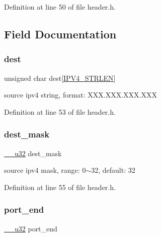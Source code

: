 Definition at line 50 of file header.\+h.



\subsection{Field Documentation}
\mbox{\label{struct_input_arguments_a2fbdfdcfd2976c224421d481d0935d8d}} 
\subsubsection{\texorpdfstring{dest}{dest}}
{\footnotesize\ttfamily unsigned char dest\mbox{[}\hyperlink{header_8h_ad5057f0ae40bc5ff36e7c9e65ea6c457}{I\+P\+V4\+\_\+\+S\+T\+R\+L\+EN}\mbox{]}}

source ipv4 string, format\+: X\+X\+X.\+X\+X\+X.\+X\+X\+X.\+X\+XX 

Definition at line 53 of file header.\+h.

\mbox{\label{struct_input_arguments_a63b8e9efc215ebefa3d898701531e296}} 
\subsubsection{\texorpdfstring{dest\+\_\+mask}{dest\_mask}}
{\footnotesize\ttfamily \hyperlink{asm__types_8h_a3acae9310e2c2e411e800a8a369171c6}{\+\_\+\+\_\+u32} dest\+\_\+mask}

source ipv4 mask, range\+: 0$\sim$32, default\+: 32 

Definition at line 55 of file header.\+h.

\mbox{\label{struct_input_arguments_ac3c6eeaeb713047db039592d5c1f0f01}} 
\subsubsection{\texorpdfstring{port\+\_\+end}{port\_end}}
{\footnotesize\ttfamily \hyperlink{asm__types_8h_a3acae9310e2c2e411e800a8a369171c6}{\+\_\+\+\_\+u32} port\+\_\+end}

